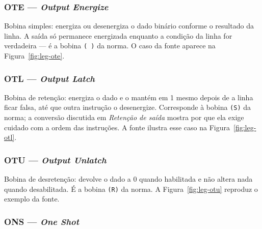 

\subsubsection{OTE --- \emph{Output Energize}}

Bobina simples: energiza ou desenergiza o dado binário conforme o resultado da linha. A saída só
permanece energizada enquanto a condição da linha for verdadeira --- é a bobina \texttt{( )} da norma.
O caso da fonte aparece na Figura~\ref{fig:leg-ote}.


\subsubsection{OTL --- \emph{Output Latch}}

Bobina de retenção: energiza o dado e o mantém em 1 mesmo depois de a linha ficar falsa, até que outra
instrução o desenergize. Corresponde à bobina \texttt{(S)} da norma; a conversão discutida em
\emph{Retenção de saída} mostra por que ela exige cuidado com a ordem das instruções.
A fonte ilustra esse caso na Figura~\ref{fig:leg-otl}.


\subsubsection{OTU --- \emph{Output Unlatch}}

Bobina de desretenção: devolve o dado a 0 quando habilitada e não altera nada quando desabilitada. É a
bobina \texttt{(R)} da norma.
A Figura~\ref{fig:leg-otu} reproduz o exemplo da fonte.


\subsubsection{ONS --- \emph{One Shot}}

